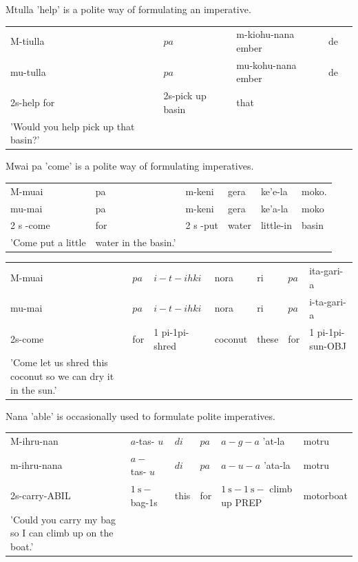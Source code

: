 \documentclass[10pt]{article}
\begin{document}
Mtulla 'help' is a polite way of formulating an imperative.

\begin{center}
\begin{tabular}{lllll}
M-tiulla & \(p a\) & m-kiohu-nana ember & de \\
mu-tulla & \(p a\) & mu-kohu-nana ember & de \\
2s-help for & 2s-pick up basin & that &  \\
'Would you help pick up that basin?' &  &  &  \\
\end{tabular}
\end{center}

Mwai pa 'come' is a polite way of formulating imperatives.

\begin{center}
\begin{tabular}{llllll}
M-muai & pa & m-keni & gera & ke'e-la & moko. \\
mu-mai & pa & m-keni & gera & ke'a-la & moko \\
2 s -come & for & 2 s -put & water & little-in & basin \\
'Come put a little & water in the basin.' &  &  &  &  \\
\end{tabular}
\end{center}

\begin{center}
\begin{tabular}{lllllll}
M-muai & \(p a\) & \(i-t-i h k i\) & nora & ri & \(p a\) & ita-gari-a \\
mu-mai & \(p a\) & \(i-t-i h k i\) & nora & ri & \(p a\) & i-ta-gari-a \\
2s-come & for & 1 pi-1pi-shred & coconut & these & for & 1 pi-1pi-sun-OBJ \\
'Come let us shred this coconut so we can dry it in the sun.' &  &  &  &  &  &  \\
\end{tabular}
\end{center}

Nana 'able' is occasionally used to formulate polite imperatives.

\begin{center}
\begin{tabular}{llllll}
M-ihru-nan & \(a\)-tas- \(u\) & \(d i\) & \(p a\) & \(a-g-a\) 'at-la & motru \\
m-ihru-nana & \(a-\) tas- \(u\) & \(d i\) & \(p a\) & \(a-u-a\) 'ata-la & motru \\
2s-carry-ABIL & \(1 \mathrm{~s}-\) bag-1s & this & for & \(1 \mathrm{~s}-1 \mathrm{~s}-\) climb up PREP & motorboat \\
'Could you carry my bag so I can climb up on the boat.' &  &  &  &  &  \\
\end{tabular}
\end{center}
\end{document}
